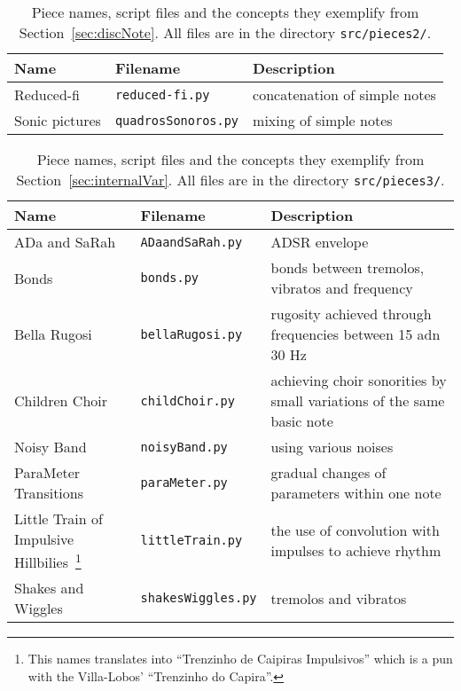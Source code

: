 \documentclass{scrreprt}
\begin{document}
\begin{table*}[htp!]
\centering
\caption{Piece names, script files and the concepts they exemplify from Section~\ref{sec:discNote}. All files are in the directory \texttt{src/pieces2/}.}
\begin{tabular}{ p{5cm} | p{3.5cm} | p{6.2cm} }
   Name & Filename & Description \\\hline
 Reduced-fi & \texttt{reduced-fi.py} & concatenation of simple notes \\
 Sonic pictures & \texttt{quadrosSonoros.py} & mixing of simple notes  \\
\end{tabular}
\end{table*}

\begin{table*}[htp!]
\centering
\caption{Piece names, script files and the concepts they exemplify from Section~\ref{sec:internalVar}. All files are in the directory \texttt{src/pieces3/}.}
\begin{tabular}{ p{5cm} | p{3.5cm} | p{6.2cm} }
   Name & Filename & Description \\\hline
 ADa and SaRah & \texttt{ADaandSaRah.py} & ADSR envelope \\
 Bonds & \texttt{bonds.py} & bonds between tremolos, vibratos and frequency  \\
 Bella Rugosi & \texttt{bellaRugosi.py} & rugosity achieved through frequencies between 15 adn 30 Hz \\
 Children Choir & \texttt{childChoir.py} & achieving choir sonorities by small variations of the same basic note \\
 Noisy Band & \texttt{noisyBand.py} & using various noises \\
 ParaMeter Transitions & \texttt{paraMeter.py} & gradual changes of parameters within one note \\
 Little Train of Impulsive Hillbilies~\footnote{This names translates into ``Trenzinho de Caipiras Impulsivos'' which is a pun with the Villa-Lobos' ``Trenzinho do Capira''.} & \texttt{littleTrain.py} & the use of convolution with impulses to achieve rhythm \\
 Shakes and Wiggles & \texttt{shakesWiggles.py} &  tremolos and vibratos \\
\end{tabular}
\end{table*}
\end{document}
